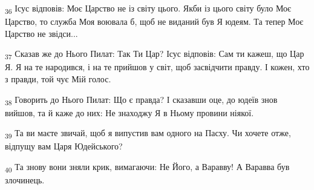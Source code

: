 \begin{tcolorbox}
\textsubscript{36} Ісус відповів: Моє Царство не із світу цього. Якби із цього світу було Моє Царство, то служба Моя воювала б, щоб не виданий був Я юдеям. Та тепер Моє Царство не звідси...
\end{tcolorbox}
\begin{tcolorbox}
\textsubscript{37} Сказав же до Нього Пилат: Так Ти Цар? Ісус відповів: Сам ти кажеш, що Цар Я. Я на те народився, і на те прийшов у світ, щоб засвідчити правду. І кожен, хто з правди, той чує Мій голос.
\end{tcolorbox}
\begin{tcolorbox}
\textsubscript{38} Говорить до Нього Пилат: Що є правда? І сказавши оце, до юдеїв знов вийшов, та й каже до них: Не знаходжу Я в Ньому провини ніякої.
\end{tcolorbox}
\begin{tcolorbox}
\textsubscript{39} Та ви маєте звичай, щоб я випустив вам одного на Пасху. Чи хочете отже, відпущу вам Царя Юдейського?
\end{tcolorbox}
\begin{tcolorbox}
\textsubscript{40} Та знову вони зняли крик, вимагаючи: Не Його, а Варавву! А Варавва був злочинець.
\end{tcolorbox}
